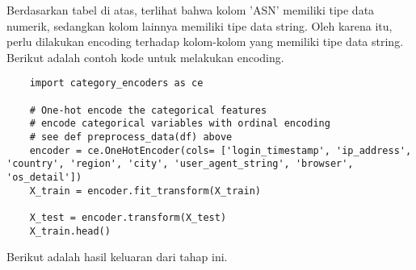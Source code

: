 Berdasarkan tabel di atas, terlihat bahwa kolom 'ASN' memiliki tipe data numerik, sedangkan kolom lainnya memiliki tipe data string. Oleh karena itu, perlu dilakukan encoding terhadap kolom-kolom yang memiliki tipe data string. Berikut adalah contoh kode untuk melakukan encoding.

\begin{lstlisting}
    import category_encoders as ce

    # One-hot encode the categorical features
    # encode categorical variables with ordinal encoding
    # see def preprocess_data(df) above
    encoder = ce.OneHotEncoder(cols= ['login_timestamp', 'ip_address', 'country', 'region', 'city', 'user_agent_string', 'browser', 'os_detail'])
    X_train = encoder.fit_transform(X_train)
    
    X_test = encoder.transform(X_test)
    X_train.head()
    \end{lstlisting}

Berikut adalah hasil keluaran dari tahap ini.

